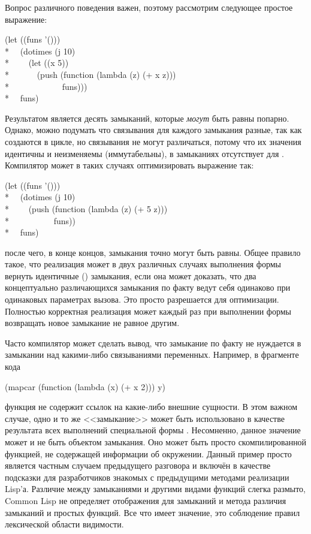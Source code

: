 \begin{defspec}
Вопрос различного поведения важен, поэтому рассмотрим следующее простое выражение:
\begin{lisp}
(let ((funs '())) \\*
~~(dotimes (j 10) \\*
~~~~(let ((x 5)) \\*
~~~~~~(push (function (lambda (z) (+ x z))) \\*
~~~~~~~~~~~~funs))) \\*
~~funs)
\end{lisp}
Результатом является десять замыканий, которые \emph{могут} быть равны 
попарно. Однако, можно подумать что связывания  для каждого замыкания разные, так
как создаются в цикле, но связывания не могут различаться, потому что их значения
идентичны и неизменяемы (иммутабельны), в замыканиях отсутствует  для
.
Компилятор может в таких случаях оптимизировать выражение так:
\begin{lisp}
(let ((funs '())) \\*
~~(dotimes (j 10) \\*
~~~~(push (function (lambda (z) (+ 5 z))) \\*
~~~~~~~~~~funs)) \\*
~~funs)
\end{lisp}
после чего, в конце концов, замыкания точно могут быть равны.
Общее правило такое, что реализация может в двух различных случаях выполнения
формы  вернуть идентичные () замыкания, если она может
доказать, что два концептуально различающихся замыкания по факту ведут себя
одинаково при одинаковых параметрах вызова.
Это просто разрешается для оптимизации. Полностью корректная реализация может
каждый раз при выполнении формы  возвращать новое замыкание не
равное  другим.

Часто компилятор может сделать вывод, что замыкание по факту не нуждается в
замыкании над какими-либо связываниями переменных. Например,
в фрагменте кода
\begin{lisp}
(mapcar (function (lambda (x) (+ x 2))) y)
\end{lisp}
функция  не содержит ссылок на какие-либо внешние
сущности. В этом важном случае, одно и то же <<замыкание>> может
быть использовано в качестве результата всех выполнений специальной формы
.
Несомненно, данное значение может и не быть объектом замыкания. Оно может быть
просто скомпилированной функцией, не содержащей информации об окружении.
Данный пример просто является частным случаем предыдущего разговора и включён в
качестве подсказки для разработчиков знакомых с предыдущими методами реализации
Lisp'а. Различие между замыканиями и другими видами функций слегка размыто,
Common Lisp не определяет отображения для замыканий и метода различия замыканий
и простых функций. Все что имеет значение, это соблюдение правил лексической
области видимости.


\end{defspec}
